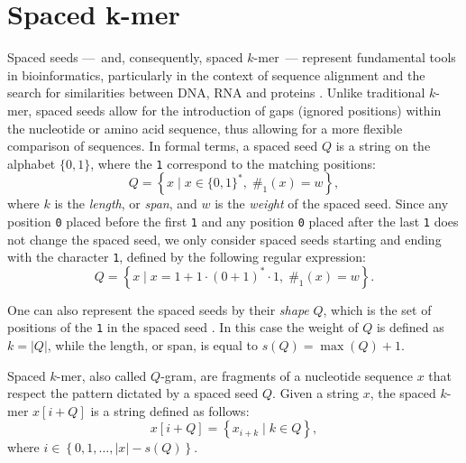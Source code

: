 \section[Spaced $k$-mer]{Spaced k-mer}
\label{sec:spacedkmer}

Spaced seeds ---~and, consequently, spaced $k$-mer~--- represent fundamental tools in bioinformatics, particularly in the context of sequence alignment and the search for similarities between DNA, RNA and proteins \cite{brinda2015spaced,ounit2016higher,girotto2017theoretical}. Unlike traditional $k$-mer, spaced seeds allow for the introduction of gaps (ignored positions) within the nucleotide or amino acid sequence, thus allowing for a more flexible comparison of sequences. In formal terms, a spaced seed $Q$ is a string on the alphabet $\{0, 1\}$, where the \texttt{1} correspond to the matching positions: \[ Q = \left\{ x \; | \; x \in \{0, 1\}^*, \; \#_1(x) = w \right\}, \] where $k$ is the \emph{length}, or \emph{span}, and $w$ is the \emph{weight} of the spaced seed. Since any position \texttt{0} placed before the first \texttt{1} and any position \texttt{0} placed after the last \texttt{1} does not change the spaced seed, we only consider spaced seeds starting and ending with the character \texttt{1}, defined by the following regular expression: \begin{equation}\label{eq:spaced_kmer}
	Q = \left\{ x \; | \; x = 1 + 1 \cdot (0 + 1)^* \cdot 1, \; \#_1(x) = w \right\}.
\end{equation}

One can also represent the spaced seeds by their \emph{shape} $Q$, which is the set of positions of the \texttt{1} in the spaced seed \cite{keich2004spaced}. In this case the weight of $Q$ is defined as $k = |Q|$, while the length, or span, is equal to $s(Q) = \max(Q) + 1$. 

Spaced $k$-mer, also called $Q$-gram, are fragments of a nucleotide sequence $x$ that respect the pattern dictated by a spaced seed $Q$. Given a string $x$, the spaced $k$-mer $x[i + Q]$ is a string defined as follows: \[ x[i + Q] = \left\{ x_{i + k} \; | \; k \in Q \right\}, \] where $i \in \left\{0, 1, \dots, |x| - s(Q) \right\}$. 

